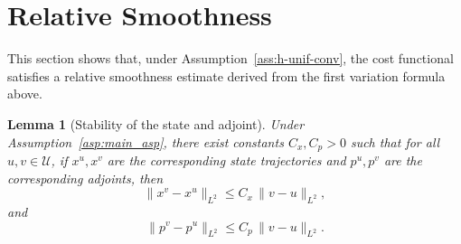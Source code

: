 \documentclass[11pt]{amsart}
\theoremstyle{plain}
\newtheorem{lemma}{Lemma}
\theoremstyle{definition}
\theoremstyle{remark}
\begin{document}
\section{Relative Smoothness}\label{sec:re_smooth}

This section shows that, under Assumption~\ref{ass:h-unif-conv}, the cost functional satisfies a relative smoothness estimate derived from the first variation formula above.

\begin{lemma}[Stability of the state and adjoint]\label{lem:state-adjoint-stability}
Under Assumption~\ref{asp:main_asp}, there exist constants $C_x, C_p >0$ such that for all $u,v\in\mathcal U$, if $x^u,x^v$ are the corresponding state trajectories and $p^u,p^v$ are the corresponding adjoints, then
\begin{equation}\label{eq:state-stability}
\|x^v-x^u\|_{L^2}
\le
C_x \,\|v-u\|_{L^2},
\end{equation}
and
\begin{equation}\label{eq:adjoint-stability}
\|p^v-p^u\|_{L^2}
\le
C_p \,\|v-u\|_{L^2}.
\end{equation}
\end{lemma}
\end{document}
